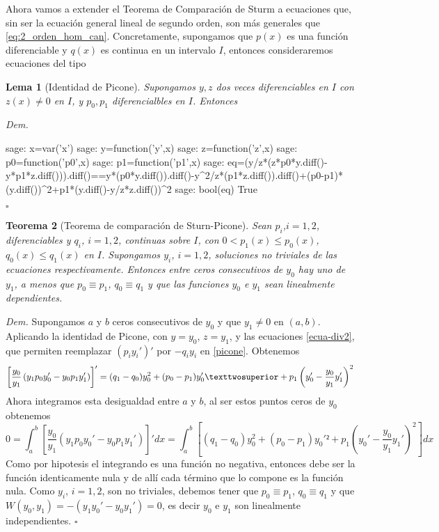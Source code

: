 \documentclass{article}
\newenvironment{demo}{\noindent\emph{Dem.}}{{\hspace*{\fill}$\square$} \newline\vspace{5pt}}
\newtheorem{teorema}{Teorema}[section]
\newtheorem{lema}[teorema]{Lema}
\begin{document}
Ahora vamos a extender el Teorema de Comparación de Sturm a ecuaciones que, sin ser la ecuación general lineal de segundo orden, son más generales que \eqref{eq:2_orden_hom_can}. Concretamente, supongamos que $p(x)$ es una función diferenciable y $q(x)$ es continua en un intervalo $I$, entonces consideraremos ecuaciones del tipo

\begin{lema}[Identidad de Picone] Supongamos $y,z$ dos veces diferenciables en $I$ con $z(x)\neq 0$ en $I$, y $p_0,p_1$ diferencialbles en $I$. Entonces
\end{lema}
\begin{demo} 
\begin{sagecommandline}
sage: x=var('x')
sage: y=function('y',x)
sage: z=function('z',x)
sage: p0=function('p0',x)
sage: p1=function('p1',x)
sage: eq=(y/z*(z*p0*y.diff()-y*p1*z.diff())).diff()==y*(p0*y.diff()).diff()-y^2/z*(p1*z.diff()).diff()+(p0-p1)*(y.diff())^2+p1*(y.diff()-y/z*z.diff())^2
sage: bool(eq)
True
\end{sagecommandline}
\end{demo}
\begin{teorema}[Teorema de comparación de Sturn-Picone] Sean $p_i$,$i=1,2$,  diferenciables y $q_i$, $i=1,2$, continuas sobre $I$, con $0<p_1(x)\leq p_0(x)$, $q_0(x)\leq q_1(x)$ en $I$.  Supongamos $y_i$, $i=1,2$, soluciones no triviales de las ecuaciones 
respectivamente.  Entonces entre ceros consecutivos de $y_0$ hay uno de $y_1$, a menos que $p_0\equiv p_1$, $q_0\equiv q_1$ y que las funciones $y_0$ e $y_1$ sean linealmente dependientes. 
\end{teorema}
\begin{demo} Supongamos $a$ y $b$ ceros consecutivos de $y_0$ y que $y_1\neq 0$ en $(a,b)$. Aplicando la identidad de Picone, con $y=y_0$, $z=y_1$, y las ecuaciones \eqref{ecua-div2}, que permiten reemplazar $(p_iy_i')'$ por $-q_iy_i$ en  \eqref{picone}. Obtenemos
\[\left[\frac{y_0}{y_1}\left(y_1p_0y_0'-y_0p_1y_1' \right) \right]'=
  (q_1-q_0)y_0^2+(p_0-p_1)y_0'²+p_1\left(y_0'-\frac{y_0}{y_1}y_1'\right)^2\\
\]
Ahora integramos esta desigualdad entre $a$ y $b$, al ser estos puntos ceros de $y_0$ obtenemos
\[0=\int_a^b\left[\frac{y_0}{y_1}\left(y_1p_0y_0'-y_0p_1y_1' \right) \right]'dx=
\int_a^b\left[
  (q_1-q_0)y_0^2+(p_0-p_1)y_0'²+p_1\left(y_0'-\frac{y_0}{y_1}y_1'\right)^2\right]dx\]
Como por hipotesis el integrando es una función no negativa, entonces debe ser la función identicamente nula y de allí cada término que lo compone es la función nula. Como $y_i$, $i=1,2$, son no triviales, debemos tener que   $p_0\equiv p_1$, $q_0\equiv q_1$ y que $W(y_0,y_1)=-(y_1y_0'-y_0y_1')=0$, es decir $y_0$ e $y_1$ son linealmente independientes.
\end{demo}
\end{document}
